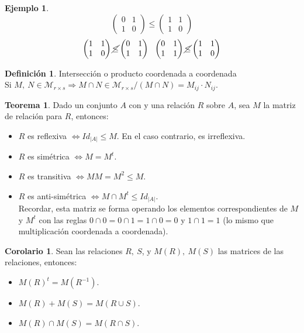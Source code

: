 \documentclass[10pt]{article}
\theoremstyle{definition}
\newtheorem{definition}{Definición}[section]
\newtheorem{theorem}{Teorema}[section]
\newtheorem{corollary}{Corolario}[theorem]
\newtheorem{example}{Ejemplo}[section]
\begin{document}
\begin{example}{ \ }\\
	$$\begin{pmatrix} 0 & 1\\1 & 0 \end{pmatrix}\le \begin{pmatrix} 1 & 1\\1 & 0 \end{pmatrix}$$
	$$\begin{pmatrix} 1 & 1\\1 & 0 \end{pmatrix} \cancel{\le} \begin{pmatrix} 0 & 1\\ 1 & 1 \end{pmatrix}\ \
		\begin{pmatrix} 0&1\\1&1 \end{pmatrix} \cancel{\le} \begin{pmatrix} 1&1\\1&0 \end{pmatrix} $$
\end{example}\hfill\break
\begin{definition}{Intersección o producto coordenada a coordenada}
	\\Si $M,\ N\in\mathcal{M}_{r\times s}\Rightarrow M\cap N\in\mathcal{M}_{r\times s} / (M\cap N)=M_{ij}\cdot N_{ij}$.
\end{definition}
\begin{theorem}
	Dado un conjunto $A$ con y una relación $R$ sobre $A$, sea $M$ la matriz de relación para $R$, entonces:
	\begin{itemize}
		\item $R$ es reflexiva $\Leftrightarrow Id_{|A|}\le M$. En el caso contrario, es irreflexiva.
		\item $R$ es simétrica $\Leftrightarrow M=M^t$.
		\item $R$ es transitiva $\Leftrightarrow MM=M^2\le M$.
		\item $R$ es anti-simétrica $\Leftrightarrow M\cap M^t\le Id_{|A|}$.\\
		      Recordar, esta matriz se forma operando los elementos correspondientes de $M$ y $M^t$ con las reglas $0\cap0=0\cap1=1\cap0=0$ y $1\cap1=1$ (lo mismo que multiplicación coordenada a coordenada).
	\end{itemize}
\end{theorem}
\begin{corollary}
	Sean las relaciones $R,\ S$, y $M(R),\ M(S)$ las matrices de las relaciones, entonces:
	\begin{itemize}
		\item $M(R)^t=M(R^{-1})$.
		\item $M(R)+M(S)=M(R\cup S)$.
		\item $M(R)\cap M(S)=M(R\cap S)$.
	\end{itemize}
\end{corollary}
\end{document}
